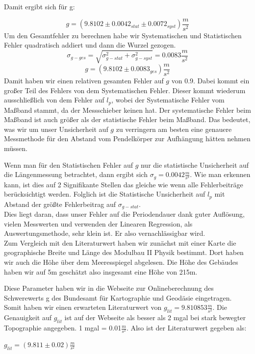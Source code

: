 \documentclass[twoside]{protokoll}
\begin{document}
Damit ergibt sich für g:

\begin{equation}
    g = (9.8102 \pm 0.0042_{stat} \pm 0.0072_{syst}) \frac{m}{s^2}
\end{equation}
Um den Gesamtfehler zu berechnen habe wir Systematischen und Statistischen Fehler quadratisch addiert und dann die Wurzel gezogen.
\begin{equation}
    \sigma_{g-ges} = \sqrt{\sigma_{g-stat}^2 + \sigma_{g-syst}^2} = 0.0083 \frac{m}{s^2}
\end{equation}
\begin{equation}
    g = (9.8102 \pm 0.0083_{ges}) \frac{m}{s^2}
\end{equation}
Damit haben wir einen relativen gesamten Fehler auf $g$ von 0.9\textperthousand.
Dabei kommt ein großer Teil des Fehlers von dem Systematischen Fehler.
Dieser kommt wiederum ausschließlich von dem Fehler auf $l_p$, wobei der Systematische Fehler vom Maßband stammt, da der Messschieber keinen hat.
Der systematische Fehler beim Maßband ist auch größer als der statistische Fehler beim Maßband.
Das bedeutet, was wir um unser Unsicherheit auf $g$ zu verringern am besten eine genauere Messmethode für den Abstand vom Pendelkörper zur Aufhängung hätten nehmen müssen.

Wenn man für den Statistischen Fehler auf $g$ nur die statistische Unsicherheit auf die Längenmessung betrachtet, dann ergibt sich $\sigma_{g} = 0.0042 \frac{m}{s^2}$.
Wie man erkennen kann, ist dies auf 2 Signifikante Stellen das gleiche wie wenn alle  Fehlerbeiträge berücksichtigt werden.
Folglich ist die Statistische Unsicherheit auf $l_p$ mit Abstand der größte Fehlerbeitrag auf $\sigma_{g-stat}$. \\
Dies liegt daran, dass unser Fehler auf die Periodendauer dank guter Auflösung, vielen Messwerten und verwenden der Linearen Regression, als Auswertungsmethode, sehr klein ist. 
Er also vernachlässigbar wird. \\



Zum Vergleich mit den Literaturwert haben wir zunächst mit einer Karte die geographische Breite und Länge des Modulbau II Physik bestimmt.
Dort haben wir auch die Höhe über dem Meeresspiegel abgelesen. 
Die Höhe des Gebäudes haben wir auf 5m geschätzt also insgesamt eine Höhe von 215m.

Diese Parameter haben wir in die Webseite zur Onlineberechnung des Schwerewerts g des Bundesamt für Kartographie und Geodäsie eingetragen. 
Somit haben wir einen erwarteten Literaturwert von $g_{lit} = 9.810853 \frac{m}{s^2}$.
Die Genauigkeit auf $g_{lit}$ ist auf der Webseite als besser als 2 mgal bei stark bewegter Topographie angegeben.
1 mgal = 0.01$\frac{m}{s^2}$. Also ist der Literaturwert gegeben als:
\begin{center}
$g_{lit} = \left(9.811 \pm 0.02 \right)\frac{m}{s^2}$
\end{center}
\end{document}
